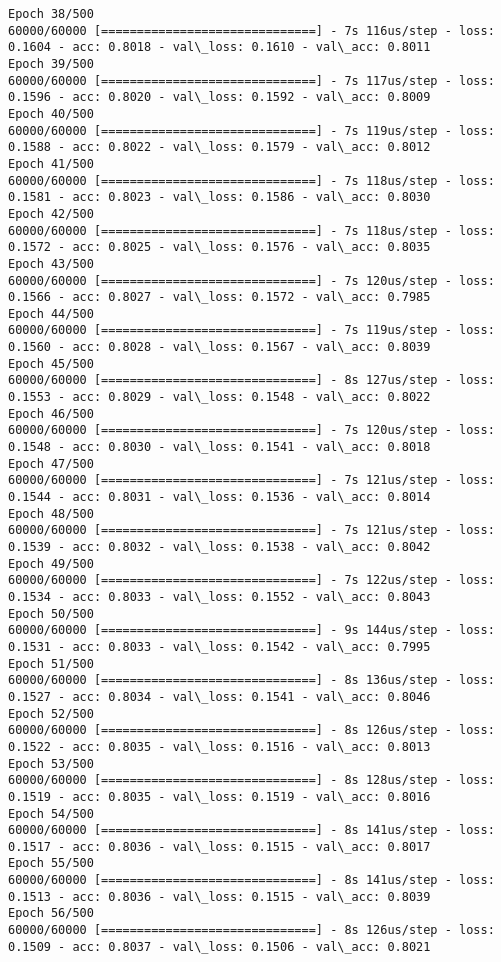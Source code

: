 \documentclass[11pt]{article}
\begin{document}
\begin{Verbatim}[commandchars=\\\{\}]
Epoch 38/500
60000/60000 [==============================] - 7s 116us/step - loss: 0.1604 - acc: 0.8018 - val\_loss: 0.1610 - val\_acc: 0.8011
Epoch 39/500
60000/60000 [==============================] - 7s 117us/step - loss: 0.1596 - acc: 0.8020 - val\_loss: 0.1592 - val\_acc: 0.8009
Epoch 40/500
60000/60000 [==============================] - 7s 119us/step - loss: 0.1588 - acc: 0.8022 - val\_loss: 0.1579 - val\_acc: 0.8012
Epoch 41/500
60000/60000 [==============================] - 7s 118us/step - loss: 0.1581 - acc: 0.8023 - val\_loss: 0.1586 - val\_acc: 0.8030
Epoch 42/500
60000/60000 [==============================] - 7s 118us/step - loss: 0.1572 - acc: 0.8025 - val\_loss: 0.1576 - val\_acc: 0.8035
Epoch 43/500
60000/60000 [==============================] - 7s 120us/step - loss: 0.1566 - acc: 0.8027 - val\_loss: 0.1572 - val\_acc: 0.7985
Epoch 44/500
60000/60000 [==============================] - 7s 119us/step - loss: 0.1560 - acc: 0.8028 - val\_loss: 0.1567 - val\_acc: 0.8039
Epoch 45/500
60000/60000 [==============================] - 8s 127us/step - loss: 0.1553 - acc: 0.8029 - val\_loss: 0.1548 - val\_acc: 0.8022
Epoch 46/500
60000/60000 [==============================] - 7s 120us/step - loss: 0.1548 - acc: 0.8030 - val\_loss: 0.1541 - val\_acc: 0.8018
Epoch 47/500
60000/60000 [==============================] - 7s 121us/step - loss: 0.1544 - acc: 0.8031 - val\_loss: 0.1536 - val\_acc: 0.8014
Epoch 48/500
60000/60000 [==============================] - 7s 121us/step - loss: 0.1539 - acc: 0.8032 - val\_loss: 0.1538 - val\_acc: 0.8042
Epoch 49/500
60000/60000 [==============================] - 7s 122us/step - loss: 0.1534 - acc: 0.8033 - val\_loss: 0.1552 - val\_acc: 0.8043
Epoch 50/500
60000/60000 [==============================] - 9s 144us/step - loss: 0.1531 - acc: 0.8033 - val\_loss: 0.1542 - val\_acc: 0.7995
Epoch 51/500
60000/60000 [==============================] - 8s 136us/step - loss: 0.1527 - acc: 0.8034 - val\_loss: 0.1541 - val\_acc: 0.8046
Epoch 52/500
60000/60000 [==============================] - 8s 126us/step - loss: 0.1522 - acc: 0.8035 - val\_loss: 0.1516 - val\_acc: 0.8013
Epoch 53/500
60000/60000 [==============================] - 8s 128us/step - loss: 0.1519 - acc: 0.8035 - val\_loss: 0.1519 - val\_acc: 0.8016
Epoch 54/500
60000/60000 [==============================] - 8s 141us/step - loss: 0.1517 - acc: 0.8036 - val\_loss: 0.1515 - val\_acc: 0.8017
Epoch 55/500
60000/60000 [==============================] - 8s 141us/step - loss: 0.1513 - acc: 0.8036 - val\_loss: 0.1515 - val\_acc: 0.8039
Epoch 56/500
60000/60000 [==============================] - 8s 126us/step - loss: 0.1509 - acc: 0.8037 - val\_loss: 0.1506 - val\_acc: 0.8021

\end{Verbatim}
\end{document}
